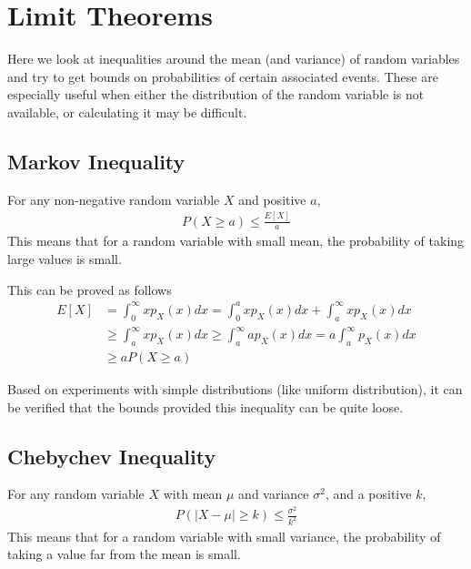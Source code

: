 \documentclass[../probability-notes.tex]{subfiles}
\begin{document}
    \chapter{Limit Theorems}
    Here we look at inequalities around the mean (and variance) of random variables and try to get bounds on probabilities of certain associated events. These are especially useful when either the distribution of the random variable is not available, or calculating it may be difficult.

    \section{Markov Inequality}
    For any non-negative random variable $X$ and positive $a$,
    \begin{align*}
        P(X \geq a) \leq \frac{E[X]}{a}
    \end{align*}
    This means that for a random variable with small mean, the probability of taking large values is small.\newline

    This can be proved as follows
    \begin{align*}
        E[X] &= \int_{0}^{\infty} xp_{X}(x) dx = \int_{0}^{a} xp_{X}(x) dx + \int_{a}^{\infty} xp_{X}(x) dx\\
        &\geq \int_{a}^{\infty} xp_{X}(x) dx \geq \int_{a}^{\infty} ap_{X}(x) dx = a\int_{a}^{\infty} p_{X}(x) dx\\
        &\geq aP(X \geq a)
    \end{align*}

    Based on experiments with simple distributions (like uniform distribution), it can be verified that the bounds provided this inequality can be quite loose.

    \section{Chebychev Inequality}
    For any random variable $X$ with mean $\mu$ and variance $\sigma^{2}$, and a positive $k$,
    \begin{align*}
        P(\lvert X - \mu \rvert \geq k) \leq \frac{\sigma^{2}}{k^{2}}
    \end{align*}
    This means that for a random variable with small variance, the probability of taking a value far from the mean is small.\newline
\end{document}
